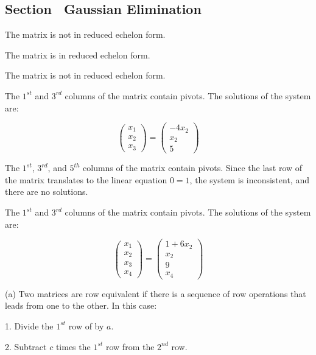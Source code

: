 \documentclass{ximera}
\begin{document}
\subsection*{Section~\protect{\ref{S:Gauss}} Gaussian Elimination}


 The matrix is not in reduced echelon form.

\newpage
{} The matrix is in reduced echelon form.

 The matrix is not in reduced echelon form.

 The $1^{st}$ and $3^{rd}$ columns of the matrix contain
pivots.  The solutions of the system are:

\[
\left(\begin{array}{r} x_1 \\ x_2 \\ x_3\end{array} \right)
= \left(\begin{array}{c} -4x_2 \\ x_2 \\ 5\end{array} \right)
\]

 The $1^{st}$, $3^{rd}$, and $5^{th}$ columns of the matrix
contain pivots.  Since the last row of the matrix translates to the linear
equation $0 = 1$, the system is inconsistent, and there are no solutions.

 The $1^{st}$ and $3^{rd}$ columns of the matrix contain
pivots.  The solutions of the system are:

\[
\left(\begin{array}{r} x_1 \\ x_2 \\ x_3\\ x_4\end{array} \right)
= \left(\begin{array}{c} 1 + 6x_2 \\ x_2 \\ 9 \\ x_4\end{array} \right)
\]

(a)
Two matrices are row equivalent if there is a sequence of row operations
that leads from one to the other.  In this case:

1. Divide the $1^{st}$ row of  by $a$.

2. Subtract $c$ times the $1^{st}$ row from the $2^{nd}$ row.
\end{document}
